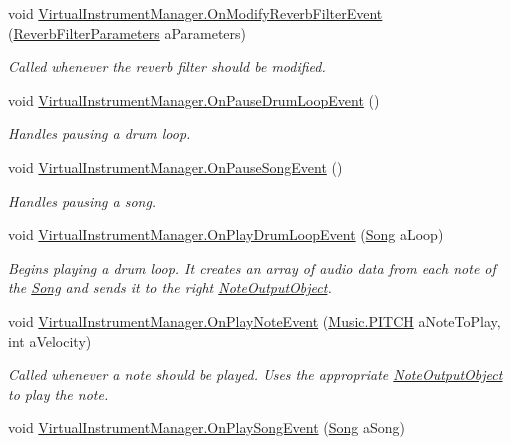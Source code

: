 \begin{DoxyCompactItemize}
void \hyperlink{group___v_i_m_handlers_ga2b310217971075b1b2db67d68fbbea5a}{Virtual\+Instrument\+Manager.\+On\+Modify\+Reverb\+Filter\+Event} (\hyperlink{group__filter_params_struct_virtual_instrument_manager_1_1_reverb_filter_parameters}{Reverb\+Filter\+Parameters} a\+Parameters)
\begin{DoxyCompactList}\small\item\em Called whenever the reverb filter should be modified. \end{DoxyCompactList}\item 
void \hyperlink{group___v_i_m_handlers_ga30cd7f00fea55becd6d90f0ec737510a}{Virtual\+Instrument\+Manager.\+On\+Pause\+Drum\+Loop\+Event} ()
\begin{DoxyCompactList}\small\item\em Handles pausing a drum loop. \end{DoxyCompactList}\item 
void \hyperlink{group___v_i_m_handlers_gad052b3cc53b35b25631f9b399be489ae}{Virtual\+Instrument\+Manager.\+On\+Pause\+Song\+Event} ()
\begin{DoxyCompactList}\small\item\em Handles pausing a song. \end{DoxyCompactList}\item 
void \hyperlink{group___v_i_m_handlers_gae2e2010b9a36ae2409466181ae0b9679}{Virtual\+Instrument\+Manager.\+On\+Play\+Drum\+Loop\+Event} (\hyperlink{class_song}{Song} a\+Loop)
\begin{DoxyCompactList}\small\item\em Begins playing a drum loop. It creates an array of audio data from each note of the \hyperlink{class_song}{Song} and sends it to the right \hyperlink{class_note_output_object}{Note\+Output\+Object}. \end{DoxyCompactList}\item 
void \hyperlink{group___v_i_m_handlers_ga80b3821df3b1488a150f6062638f105c}{Virtual\+Instrument\+Manager.\+On\+Play\+Note\+Event} (\hyperlink{group___music_enums_ga508f69b199ea518f935486c990edac1d}{Music.\+P\+I\+T\+CH} a\+Note\+To\+Play, int a\+Velocity)
\begin{DoxyCompactList}\small\item\em Called whenever a note should be played. Uses the appropriate \hyperlink{class_note_output_object}{Note\+Output\+Object} to play the note. \end{DoxyCompactList}\item 
void \hyperlink{group___v_i_m_handlers_ga7fd877a7d429403abbfd2728aa63c056}{Virtual\+Instrument\+Manager.\+On\+Play\+Song\+Event} (\hyperlink{class_song}{Song} a\+Song)

\end{DoxyCompactItemize}
